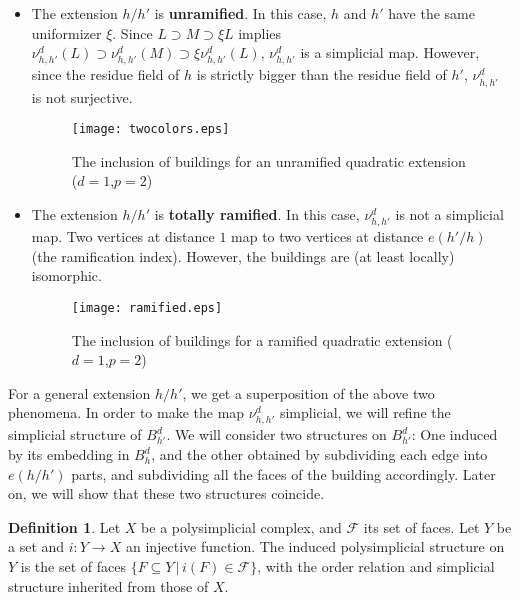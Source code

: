 \documentclass{amsart}
\theoremstyle{theorem}
\theoremstyle{lemma}
\theoremstyle{prop}
\theoremstyle{definition}
\newtheorem{definition}[lemma]{Definition}
\theoremstyle{corollary}
\theoremstyle{remark}
\newcommand{\F}{\mathcal{F}}
\newcommand{\h}{h}
\begin{document}
\begin{itemize}
\item The extension $\h/\h'$ is {\bf unramified}.
In this case, $\h$ and $\h'$ have the same uniformizer $\xi$.  Since $L\supset M \supset \xi L$ implies $\nu^d_{\h,\h'}(L)\supset \nu^d_{\h,\h'}(M) \supset \xi \nu^d_{\h,\h'}(L)$, $\nu^d_{\h,\h'}$ is a simplicial map. However, since the residue field of $\h$ is strictly bigger than the residue field of $\h'$, $\nu^d_{\h,\h'}$ is not surjective.

\begin{figure*}[h]
	\begin{center}
		\texttt{[image: twocolors.eps]}
	\end{center}
	\caption{The inclusion of buildings for an unramified quadratic extension ($d=1$,$p=2$)}
	\label{fig:twocolors}
\end{figure*}

\item The extension $\h/\h'$ is {\bf totally ramified}.
In this case, $\nu^d_{\h,\h'}$ is not a simplicial map. Two vertices at distance $1$ map to two vertices at distance $e(\h'/\h)$ (the ramification index). However, the buildings are (at least locally) isomorphic.

\begin{figure*}[h]
	\begin{center}
		\texttt{[image: ramified.eps]}
	\end{center}
	\caption{The inclusion of buildings for a ramified quadratic extension ($d=1$,$p=2$)}
	\label{fig:ramified}
\end{figure*}

\end{itemize}

For a general extension $\h/\h'$, we get a superposition of the above two phenomena. In order to make the map $\nu^d_{\h,\h'}$ simplicial, we will refine the simplicial structure of $B^d_{\h'}$. We will consider two structures on $B^d_{\h'}$: One induced by its embedding in $B^d_{\h}$, and the other obtained by subdividing each edge into $e(\h/\h')$ parts, and subdividing all the faces of the building accordingly. Later on, we will show that these two structures coincide.

\begin{definition} Let $X$ be a polysimplicial complex, and $\F$ its set of faces. Let $Y$ be a set and $i:Y\rightarrow X$ an injective function. The induced polysimplicial structure on $Y$ is the set of faces $\{ F \subseteq Y \, | \, i(F) \in \F \}$, with the order relation and simplicial structure inherited from those of $X$.
\end{definition}
\end{document}
